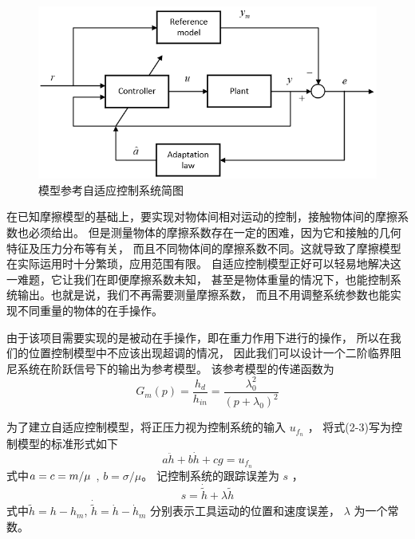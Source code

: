 \begin{figure}[!ht]
  \centering
  \includegraphics[scale=0.6]{chapter02/pic/2-2}
  \caption{模型参考自适应控制系统简图}
  \label{fig:2-2}
  \vspace{-0.3cm}
\end{figure}

在已知摩擦模型的基础上，要实现对物体间相对运动的控制，接触物体间的摩擦系数也必须给出。
但是测量物体的摩擦系数存在一定的困难，因为它和接触的几何特征及压力分布等有关，
而且不同物体间的摩擦系数不同。这就导致了摩擦模型在实际运用时十分繁琐，应用范围有限。
自适应控制模型正好可以轻易地解决这一难题，它让我们在即便摩擦系数未知，
甚至是物体重量的情况下，也能控制系统输出。也就是说，我们不再需要测量摩擦系数，
而且不用调整系统参数也能实现不同重量的物体的在手操作。

由于该项目需要实现的是被动在手操作，即在重力作用下进行的操作，
所以在我们的位置控制模型中不应该出现超调的情况，
因此我们可以设计一个二阶临界阻尼系统在阶跃信号下的输出为参考模型。
该参考模型的传递函数为
\begin{equation}
  {G_m}(p) = \frac{{{h_d}}}{{{h_{in}}}} = \frac{{\lambda _0^2}}{{{{\left( {p + {\lambda _0}} \right)}^2}}}
  \label{equ:2-4}
\end{equation}

为了建立自适应控制模型，将正压力视为控制系统的输入 $u_{f_n}$ ，
将式(2-3)写为控制模型的标准形式如下
\begin{equation}
  a\ddot h + b\dot h + cg = {u_{{f_n}}}
  \label{euq:2-5}
\end{equation}
式中$a = c = {m \mathord{\left/
{\vphantom {m \mu }} \right.
\kern-\nulldelimiterspace} \mu }$ , $b = \sigma /\mu $。
记控制系统的跟踪误差为 $s$ ，
\begin{equation}
  s = \dot{\tilde h}  + \lambda \tilde h
  \label{euq:2-6}
\end{equation}
式中$\tilde h = h - {h_m}$, $\dot{\tilde h} = \dot h - {\dot h_m}$
分别表示工具运动的位置和速度误差， $\lambda$ 为一个常数。

